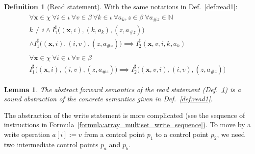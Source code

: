 \documentclass[a4paper]{article}
\newcommand{\ve}[1]{\mathbf{#1}}
\newcommand{\vx}{\ve{x}}
\newcommand{\NN}{\mathbb{N}}
\newcommand{\abstr}[1]{#1^\sharp}
\newcommand{\hash}{\#}
\theoremstyle{definition}
\newtheorem{definition}{Definition}
\theoremstyle{plain}
\newtheorem{lemma}[theorem]{Lemma}
\newcommand{\rulespacing}{\\[0.4em]}
\begin{document}
\begin{definition}[Read statement]\label{def:read1_count}
With the same notations in Def.~\ref{def:read1}:
{\small\begin{align}
\begin{aligned}
\forall \vx \in \chi~ \forall i \in \iota~ \forall v \in \beta~
  \forall k \in \iota~ \forall a_k,z \in \beta~ \forall a_{\hash z} \in \NN\\
  k \neq i \land \abstr{I}_1\big((\vx,i),(k,a_k),(z,a_{\hash z})\big) \\ \land
                 \abstr{I}_1\big((\vx,i),(i,v),(z,a_{\hash z})\big) \implies
  \abstr{I}_2(\vx,v,i,k,a_k)
\end{aligned}\rulespacing
\begin{aligned}
\forall \vx \in \chi~ \forall i \in \iota~ \forall v \in \beta \\
  \abstr{I}_1\big((\vx,i),(i,v),(z,a_{\hash z})\big) \implies
  \abstr{I}_2\big((\vx,v,i),(i,v),(z,a_{\hash z})\big)
\end{aligned}
\end{align}}
\end{definition}

\begin{lemma}
The abstract forward semantics of the read statement (Def.~\ref{def:read1_count}) is a sound abstraction of the concrete semantics given in Def.~\ref{def:read1}.
\end{lemma}

The abstraction of the write statement is more complicated (see the sequence of instructions in Formula~\ref{formula:array_multiset_write_sequence}). To move by a write operation $a[i]:=v$ from a control point $p_1$ to a control point $p_2$, we need two intermediate control points $p_a$ and $p_b$.
\end{document}
